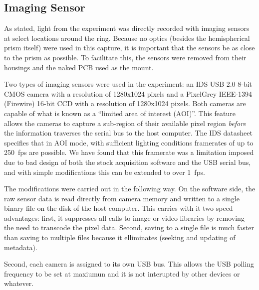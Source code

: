 \subsection{Imaging Sensor}
As stated, light from the experiment was directly recorded with imaging
sensors at select locations around the ring.  Because no optics (besides
the hemispherical prism itself) were used in this capture, it is important
that the sensors be as close to the prism as possible.  To facilitate this,
the sensors were removed from their housings and the naked PCB used as the
mount.

Two types of imaging sensors were used in the experiment: an IDS USB 2.0
8-bit CMOS camera with a resolution of 1280x1024 pixels and a PixelGrey
IEEE-1394 (Firewire) 16-bit CCD  with a resolution of 1280x1024 pixels.
Both cameras are capable of what is known as a ``limited area of interest
(AOI)''.  This feature allows the cameras to capture a sub-region of their
available pixel region \textit{before} the information traverses the serial
bus to the host computer.  The IDS datasheet specifies that in AOI mode,
with sufficient lighting conditions framerates of up to \SI{250}{fps} are
possible.  We have found that this framerate was a limitation imposed due
to bad design of both the stock acquisition software and the USB serial
bus, and with simple modifications this can be extended to over \SI{1}{fps}.

The modifications were carried out in the following way.  On the software
side, the raw sensor data is read directly from camera memory and written
to a single binary file on the disk of the host computer.  This carries
with it two speed advantages: first, it suppresses all calls to image or
video libraries by removing the need to transcode the pixel data.  Second,
saving to a single file is much faster than saving to multiple files
because it elliminates (seeking and updating of metadata).

Second, each camera is assigned to its own USB bus.  This allows the USB
polling frequency to be set at maxiumun and it is not interupted by other
devices or whatever.

